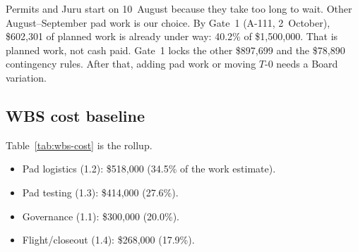 Permits and Juru start on 10~August because they take too long to wait. Other August--September pad work is our choice. By Gate~1 (A-111, 2~October), \$602{,}301 of planned work is already under way: 40.2\% of \$1{,}500{,}000. That is planned work, not cash paid. Gate~1 locks the other \$897{,}699 and the \$78{,}890 contingency rules. After that, adding pad work or moving $T$-0 needs a Board variation.

\subsection{WBS cost baseline}
\label{sec:cost-wbs}

Table~\ref{tab:wbs-cost} is the rollup.
\begin{itemize}[leftmargin=1.4em,itemsep=0.25em]
\item Pad logistics (1.2): \$518{,}000 (34.5\% of the work estimate).
\item Pad testing (1.3): \$414{,}000 (27.6\%).
\item Governance (1.1): \$300{,}000 (20.0\%).
\item Flight/closeout (1.4): \$268{,}000 (17.9\%).
\end{itemize}

